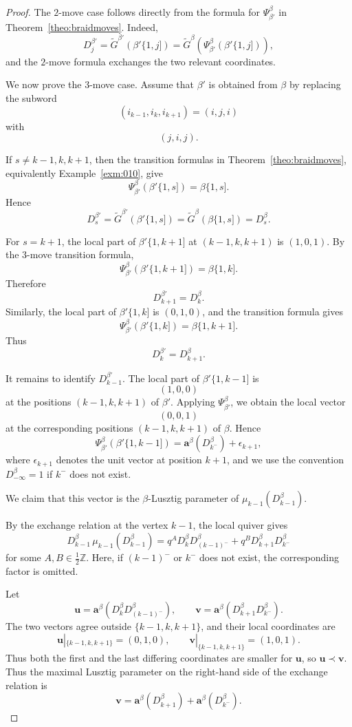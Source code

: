 \documentclass[12pt, reqno]{amsart}
\theoremstyle{plain}
\theoremstyle{definition}
\numberwithin{equation}{section}
\newcommand{\bfa}{\mathbf{a}}
\begin{document}
\begin{proof}
The \(2\)-move case follows directly from the formula for
\(\Psi_{\beta'}^\beta\) in Theorem~\ref{theo:braidmoves}. Indeed,
\[
D^{\beta'}_j
=
\widetilde G^{\beta'}(\beta'\{1,j])
=
\widetilde G^\beta\!\left(\Psi_{\beta'}^\beta(\beta'\{1,j])\right),
\]
and the \(2\)-move formula exchanges the two relevant coordinates.

We now prove the \(3\)-move case. Assume that \(\beta'\) is obtained from
\(\beta\) by replacing the subword
\[
(i_{k-1},i_k,i_{k+1})=(i,j,i)
\]
with
\[
(j,i,j).
\]

If \(s\neq k-1,k,k+1\), then the transition formulas in
Theorem~\ref{theo:braidmoves}, equivalently Example~\ref{exm:010}, give
\[
\Psi_{\beta'}^\beta(\beta'\{1,s])=\beta\{1,s].
\]
Hence
\[
D^{\beta'}_s
=
\widetilde G^{\beta'}(\beta'\{1,s])
=
\widetilde G^\beta(\beta\{1,s])
=
D^\beta_s.
\]

For \(s=k+1\), the local part of \(\beta'\{1,k+1]\) at
\((k-1,k,k+1)\) is \((1,0,1)\). By the \(3\)-move transition formula,
\[
\Psi_{\beta'}^\beta(\beta'\{1,k+1])=\beta\{1,k].
\]
Therefore
\[
D^{\beta'}_{k+1}=D^\beta_k.
\]
Similarly, the local part of \(\beta'\{1,k]\) is \((0,1,0)\), and the
transition formula gives
\[
\Psi_{\beta'}^\beta(\beta'\{1,k])=\beta\{1,k+1].
\]
Thus
\[
D^{\beta'}_k=D^\beta_{k+1}.
\]

It remains to identify \(D^{\beta'}_{k-1}\). The local part of
\(\beta'\{1,k-1]\) is
\[
(1,0,0)
\]
at the positions \((k-1,k,k+1)\) of \(\beta'\). Applying
\(\Psi_{\beta'}^\beta\), we obtain the local vector
\[
(0,0,1)
\]
at the corresponding positions \((k-1,k,k+1)\) of \(\beta\). Hence
\[
\Psi_{\beta'}^\beta(\beta'\{1,k-1])
=
\bfa^\beta(D^\beta_{k^-})+\epsilon_{k+1},
\]
where \(\epsilon_{k+1}\) denotes the unit vector at position \(k+1\), and we
use the convention \(D^\beta_{-\infty}=1\) if \(k^-\) does not exist.

We claim that this vector is the \(\beta\)-Lusztig parameter of
\(\mu_{k-1}(D^\beta_{k-1})\).

By the exchange relation at the vertex \(k-1\), the local quiver gives
\[
D^\beta_{k-1}\,\mu_{k-1}(D^\beta_{k-1})
=
q^{A}D^\beta_kD^\beta_{(k-1)^-}
+
q^{B}D^\beta_{k+1}D^\beta_{k^-}
\]
for some \(A,B\in\tfrac12\mathbb Z\). Here, if \((k-1)^-\) or \(k^-\) does not exist, the
corresponding factor is omitted.

Let
\[
\mathbf u
=
\bfa^\beta(D^\beta_kD^\beta_{(k-1)^-}),
\qquad
\mathbf v
=
\bfa^\beta(D^\beta_{k+1}D^\beta_{k^-}).
\]
The two vectors agree outside $\{k-1,k,k+1\}$, and their local
coordinates are
\[
    \mathbf u|_{\{k-1,k,k+1\}}=(0,1,0),\qquad
    \mathbf v|_{\{k-1,k,k+1\}}=(1,0,1).
\]
Thus both the first and the last differing coordinates are smaller for
$\mathbf u$, so $\mathbf u\prec\mathbf v$.
Thus the maximal Lusztig parameter on the right-hand side of the exchange
relation is
\[
\mathbf v
=
\bfa^\beta(D^\beta_{k+1})+\bfa^\beta(D^\beta_{k^-}).
\]


\end{proof}
\end{document}
